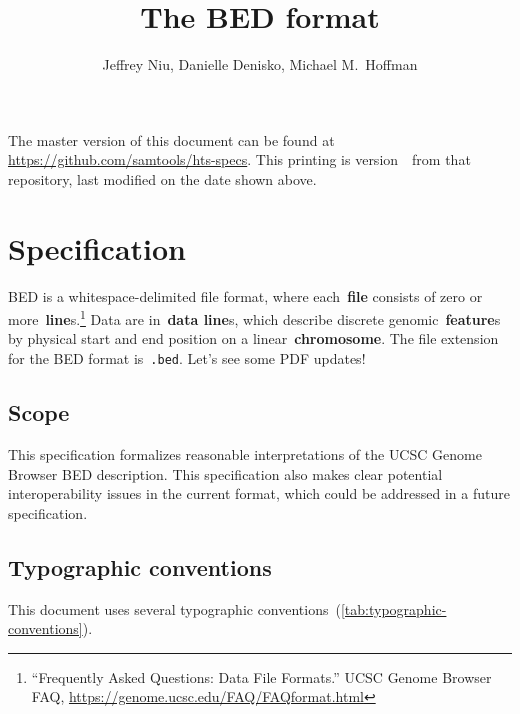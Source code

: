 \documentclass[11pt]{article}
\title{The \acf{BED} format}
\author{Jeffrey Niu, Danielle Denisko, Michael M.~Hoffman}
\date{\headdate}
\providecommand*{\Ac}[1]{\ac{#1}} %
\begin{document}
\maketitle

\begin{small}
\noindent
The master version of this document can be found at \url{https://github.com/samtools/hts-specs}.
This printing is version~\commitdesc\ from that repository, last modified on the date shown above.
\end{small}


\section{Specification}

\Ac{BED} is a whitespace-delimited file format, where each~\textbf{file} consists of zero or more~\textbf{line}s.\footnote{``Frequently Asked Questions: Data File Formats.'' \ac{UCSC} Genome Browser FAQ, \url{https://genome.ucsc.edu/FAQ/FAQformat.html}}
Data are in~\textbf{data line}s, which describe discrete genomic~\textbf{feature}s by physical start and end position on a linear~\textbf{chromosome}.
The file extension for the \ac{BED} format is~\texttt{.bed}.
Let's see some PDF updates!

\subsection{Scope}

This specification formalizes reasonable interpretations of the \ac{UCSC} Genome Browser \ac{BED} description.
This specification also makes clear potential interoperability issues in the current format, which could be addressed in a future specification.

\subsection{Typographic conventions}

This document uses several typographic conventions~(\autoref{tab:typographic-conventions}).
\end{document}
